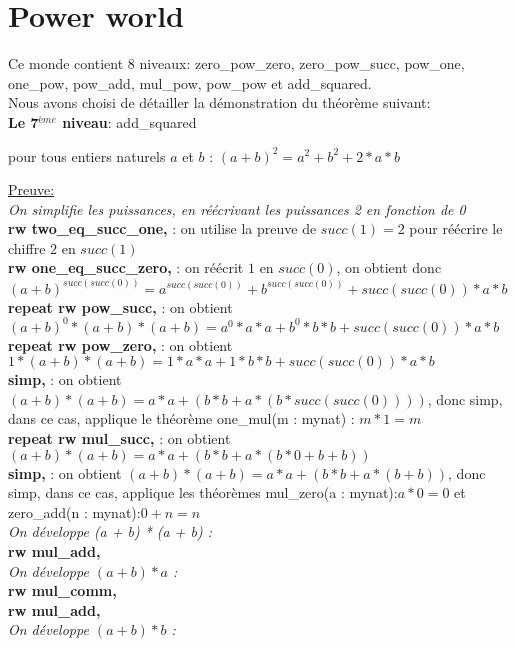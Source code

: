 \documentclass{article}
\begin{document}
\section{Power world}
Ce monde contient 8 niveaux: zero\_pow\_zero, zero\_pow\_succ, pow\_one, one\_pow, pow\_add, mul\_pow, pow\_pow et add\_squared.\\ 
Nous avons choisi de détailler la démonstration du théorème suivant: \\
\textbf{Le 7$^{ème}$ niveau}: add\_squared
\begin{center} pour tous entiers naturels $a$ et $b$ : $(a+b)^2=a^2+b^2+2*a*b $\end{center}
{\large\underline{Preuve:}}\\
 \textit{On simplifie les puissances, en réécrivant les puissances 2 en fonction de 0 }\\
  \textbf{rw two\_eq\_succ\_one,} : on utilise la preuve de $succ(1)=2$ pour réécrire le chiffre $2$ en $succ(1)$ \\
 \textbf{rw one\_eq\_succ\_zero,} :  on réécrit $1$ en $succ(0)$, on obtient donc $(a + b) ^ {succ (succ (0))} = a ^ {succ (succ (0)) }+ b ^ {succ (succ (0)) }+ succ (succ (0)) * a * b$\\
  \textbf{repeat {rw pow\_succ},} : on obtient $(a + b) ^ 0 * (a + b) * (a + b) = a ^ 0 * a * a + b ^ 0 * b * b + succ (succ (0)) * a * b$ \\
  \textbf{repeat {rw pow\_zero},} : on obtient $1 * (a + b) * (a + b) = 1 * a * a + 1 * b * b + succ (succ (0)) * a * b$\\
  \textbf{simp,} : on obtient $(a + b) * (a + b) = a * a + (b * b + a * (b * succ (succ (0))))
$, donc simp, dans ce cas, applique le théorème one\_mul(m : mynat) : $m * 1 = m$\\ 
  \textbf{repeat {rw mul\_succ},} : on obtient $(a + b) * (a + b) = a * a + (b * b + a * (b * 0 + b + b))$\\
  \textbf{simp,} : on obtient $(a + b) * (a + b) = a * a + (b * b + a * (b + b))$, donc simp, dans ce cas, applique les théorèmes mul\_zero(a : mynat):$a * 0 = 0$  et zero\_add(n : mynat):$0 + n = n$\\
  \textit{On développe (a + b) * (a + b) :} \\
 \textbf{rw mul\_add,} \\
 \textit{On développe $(a + b) * a$ :}\\
  \textbf{rw mul\_comm,} \\
  \textbf{rw mul\_add,} \\
  \textit{On développe $(a + b) * b$ :} \\
\end{document}

